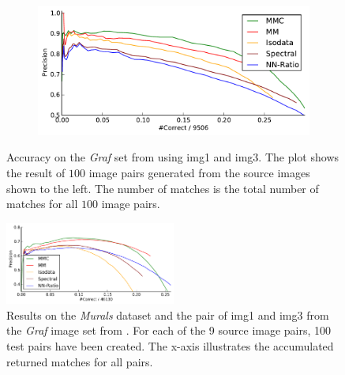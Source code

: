 \documentclass[conference]{IEEEtran}
\begin{document}
\begin{figure}
{\begin{subfigure}[t]{.13\textwidth}
		\end{subfigure}%
		~ %
		\begin{subfigure}[t]{.27\textwidth}
			\centering
			\includegraphics[width=\textwidth]{images/result_graf}
		\end{subfigure}%
	}%
	\caption{Accuracy on the \emph{Graf} set from 
		\cite{mikolajczyk2005performance} using img1 and img3. The plot 
		shows the result of $100$ image pairs generated from the source 
		images shown to the left. The number of matches is the total 
		number of matches for all $100$ image pairs.}
	\label{fig:result_graf}
\end{figure}

\begin{figure}
	\centering
	\includegraphics[width=0.5\textwidth]{images/result_accumulated}
	\caption{Results on the \emph{Murals} dataset and the pair of img1 
		and img3 from the \emph{Graf} image set from 	
		\cite{mikolajczyk2005performance}. For each of the 9 source 
		image pairs, 100 test pairs have been created.  The x-axis 
	illustrates the accumulated returned matches for all pairs.}
	\label{fig:result_accumulated}
\end{figure}
\end{document}
